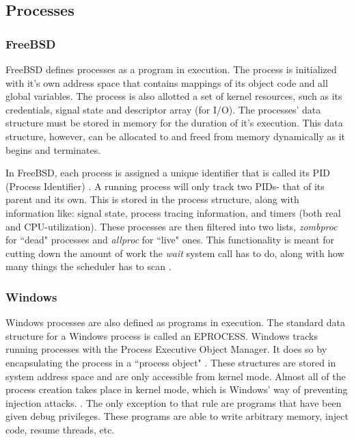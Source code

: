 

\subsection{Processes}
\label{sec:Processes}

\subsubsection{FreeBSD}
\label{sub:Process FreeBSD}

\par FreeBSD defines processes as a program in execution.
The process is initialized with it's own address space that contains mappings of its object code and all global variables.
The process is also allotted a set of kernel resources, such as its credentials, signal state and descriptor array (for I/O). \cite{bsd:1}
The processes' data structure must be stored in memory for the duration of it's execution.
This data structure, however, can be allocated to and freed from memory dynamically as it begins and terminates.

\par In FreeBSD, each process is assigned a unique identifier that is called its PID (Process Identifier) \cite{bsd:1}.
A running process will only track two PIDs- that of its parent and its own.
This is stored in the process structure, along with information like: signal state, process tracing information, and timers (both real and CPU-utilization).
These processes are then filtered into two lists, \textit{zombproc} for ``dead" processes and \textit{allproc} for ``live" ones.
This functionality is meant for cutting down the amount of work the \textit{wait} system call has to do, along with how many things the scheduler has to scan \cite{bsd:1}.

\subsubsection{Windows}
\label{sub:Process Windows}

\par Windows processes are also defined as programs in execution.
The standard data structure for a Windows process is called an EPROCESS.
Windows tracks running processes with the Process Executive Object Manager.
It does so by encapsulating the process in a ``process object" \cite{win:1}.
These structures are stored in system address space and are only accessible from kernel mode.
Almost all of the process creation takes place in kernel mode, which is Windows' way of preventing injection attacks. \cite{win:1}.
The only exception to that rule are programs that have been given debug privileges.
These programs are able to write arbitrary memory, inject code, resume threads, etc. \cite{win:1}

